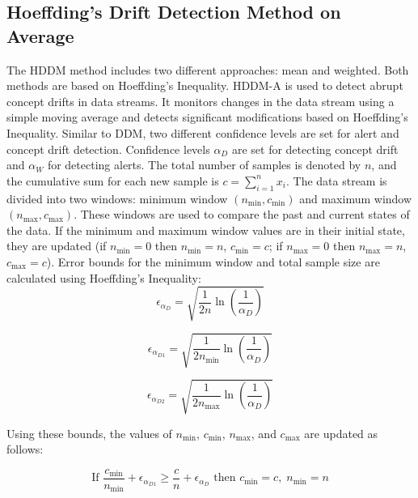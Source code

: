 \documentclass[pdflatex,sn-mathphys-ay]{sn-jnl}%
\theoremstyle{thmstyleone}%
\theoremstyle{thmstyletwo}%
\theoremstyle{thmstylethree}%
\begin{document}
\subsection{Hoeffding’s Drift Detection Method on Average}
The HDDM method \citep{frias_blanco_2015} includes two different approaches: mean and weighted. Both methods are based on Hoeffding's Inequality. HDDM-A is used to detect abrupt concept drifts in data streams. It monitors changes in the data stream using a simple moving average and detects significant modifications based on Hoeffding's Inequality. Similar to DDM, two different confidence levels are set for alert and concept drift detection. Confidence levels $\alpha_D$ are set for detecting concept drift and $\alpha_W$ for detecting alerts. The total number of samples is denoted by $n$, and the cumulative sum for each new sample is $c = \sum_{i=1}^{n} x_i$. The data stream is divided into two windows: minimum window $(n_{\text{min}}, c_{\text{min}})$ and maximum window $(n_{\text{max}}, c_{\text{max}})$. These windows are used to compare the past and current states of the data. If the minimum and maximum window values are in their initial state, they are updated (if $n_{\text{min}} = 0$ then $n_{\text{min}} = n$, $c_{\text{min}} = c$; if $n_{\text{max}} = 0$ then $n_{\text{max}} = n$, $c_{\text{max}} = c$). Error bounds for the minimum window and total sample size are calculated using Hoeffding's Inequality:
\begin{equation}
\epsilon_{\alpha_D} = \sqrt{\frac{1}{2n} \ln \left(\frac{1}{\alpha_D}\right)}
\end{equation}

\begin{equation}
\epsilon_{\alpha_{D1}} = \sqrt{\frac{1}{2n_{\text{min}}} \ln \left(\frac{1}{\alpha_D}\right)}
\end{equation}

\begin{equation}
\epsilon_{\alpha_{D2}} = \sqrt{\frac{1}{2n_{\text{max}}} \ln \left(\frac{1}{\alpha_D}\right)}
\end{equation}

\noindent Using these bounds, the values of $n_{\text{min}}$, $c_{\text{min}}$, $n_{\text{max}}$, and $c_{\text{max}}$ are updated as follows:

\begin{equation}
\label{eq1}
\text{If } \frac{c_{\text{min}}}{n_{\text{min}}} + \epsilon_{\alpha_{D1}} \geq \frac{c}{n} + \epsilon_{\alpha_D} \text{ then } c_{\text{min}} = c, \; n_{\text{min}} = n
\end{equation}
\end{document}
